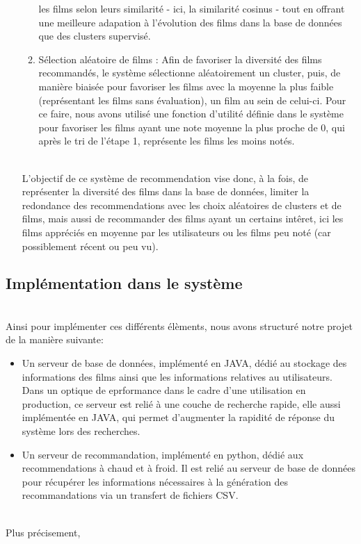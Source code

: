 \documentclass{article}
\begin{document}
\begin{itemize}
\begin{enumerate}
        les films selon leurs similarité - ici, la similarité cosinus - tout en offrant une meilleure adapation à l'évolution des films dans la base de données que des clusters supervisé.
        \item Sélection aléatoire de films : Afin de favoriser la diversité des films recommandés, le système sélectionne aléatoirement un cluster, puis, de manière biaisée pour favoriser les films avec la moyenne la plus faible (représentant les films sans évaluation), un film au sein de celui-ci.
        Pour ce faire, nous avons utilisé une fonction d'utilité définie dans le système pour favoriser les films ayant une note moyenne la plus proche de 0, qui après le tri de l'étape 1, représente les films les moins notés.
    \end{enumerate}
    $ $\\
    L'objectif de ce système de recommendation vise donc, à la fois, de représenter la diversité des films dans la base de données, limiter la redondance des recommendations avec les choix aléatoires de clusters et de films, mais aussi de recommander des films 
    ayant un certains intêret, ici les films appréciés en moyenne par les utilisateurs ou les films peu noté (car possiblement récent ou peu vu).\\

\end{itemize}


\subsection{Implémentation dans le système}
$ $\\
Ainsi pour implémenter ces différents élèments, nous avons structuré notre projet de la manière suivante:\\
\begin{itemize}
    \item Un serveur de base de données, implémenté en JAVA, dédié au stockage des informations des films ainsi que les informations relatives au utilisateurs.
    Dans un optique de eprformance dans le cadre d'une utilisation en production, ce serveur est relié à une couche de recherche rapide, elle aussi implémentée en JAVA, 
    qui permet d'augmenter la rapidité de réponse du système lors des recherches.
    \item Un serveur de recommandation, implémenté en python, dédié aux recommendations à chaud et à froid. Il est relié au serveur de base de données pour récupérer les 
    informations nécessaires à la génération des recommandations via un transfert de fichiers CSV.
\end{itemize}
$ $\\
Plus précisement,
\end{document}
